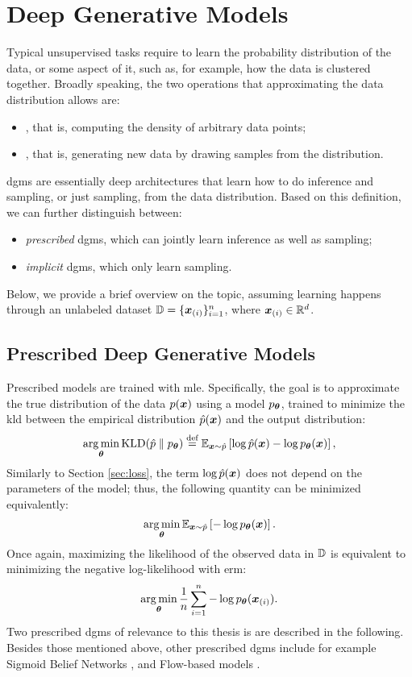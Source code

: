 \section{Deep Generative Models}\label{sec:dgm}
Typical unsupervised tasks require to learn the probability distribution of the data, or some aspect of it, such as, for example, how the data is clustered together. Broadly speaking, the two operations that approximating the data distribution allows are:
\begin{itemize}
    \item {}, that is, computing the density of arbitrary data points;
    \item {}, that is, generating new data by drawing samples from the distribution.
\end{itemize}
\glspl{dgm} \citep{goodfellow2016dl} are essentially deep architectures that learn how to do inference and sampling, or just sampling, from the data distribution. Based on this definition, we can further distinguish between:
\begin{itemize}
    \item \emph{prescribed} \glspl{dgm}, which can jointly learn inference as well as sampling;
    \item \emph{implicit} \glspl{dgm}, which only learn sampling.
\end{itemize}
Below, we provide a brief overview on the topic, assuming learning happens through an unlabeled dataset $\Data = \{\PatternVector{x}{i}\}_{i=1}^n$, where $\PatternVector{x}{i} \in \Real^d$.

\subsection{Prescribed Deep Generative Models}\label{sec:autoregressive}
Prescribed models are trained with \gls{mle}. Specifically, the goal is to approximate the true distribution of the data $p(\Vector{x})$ using a model $p_{\boldsymbol{\theta}}$, trained to minimize the \gls{kld} between the empirical distribution $\hat{p}(\Vector{x})$ and the output distribution:
$$\argmin_{\Param} \KLD{\hat{p}}{p_{\Param}} \defeq \Expectation{\Vector{x} \sim \hat{p}}{\log \hat{p}(\Vector{x}) -\log p_{\Param}(\Vector{x})},$$
Similarly to Section \ref{sec:loss}, the term $\log \hat{p}(\Vector{x})$ does not depend on the parameters of the model; thus, the following quantity can be minimized equivalently:
$$\argmin_{\Param} \Expectation{\Vector{x} \sim \hat{p}}{-\log p_{\Param}(\Vector{x})}.$$
Once again, maximizing the likelihood of the observed data in $\mathbb{D}$ is equivalent to minimizing the negative log-likelihood with \gls{erm}:
$$\argmin_{\Param} \frac{1}{n} \sum_{i=1}^n -\log p_{\Param}(\PatternVector{x}{i}).$$
Two prescribed \glspl{dgm} of relevance to this thesis is are described in the following. Besides those mentioned above, other prescribed \glspl{dgm} include for example Sigmoid Belief Networks \citep{neal1992sigmoidbeliefnet}, and Flow-based models \citep{rezende2015normalizingflows}.

